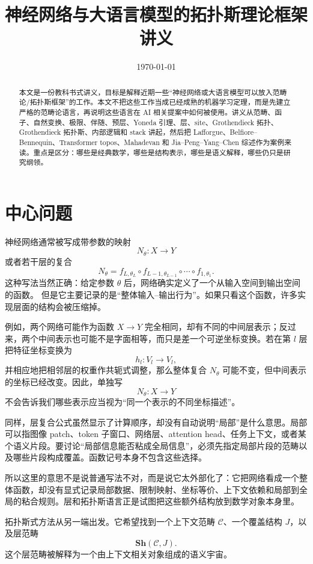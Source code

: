 \documentclass[UTF8,11pt,fontset=none]{ctexart}
\title{神经网络与大语言模型的拓扑斯理论框架讲义}
\author{}
\date{\today}
\newcommand{\Sh}{\mathbf{Sh}}
\begin{document}
\maketitle

\begin{abstract}
本文是一份教科书式讲义，目标是解释近期一些“神经网络或大语言模型可以放入范畴论/拓扑斯框架”的工作。本文不把这些工作当成已经成熟的机器学习定理，而是先建立严格的范畴论语言，再说明这些语言在 AI 相关提案中如何被使用。讲义从范畴、函子、自然变换、极限、伴随、预层、Yoneda 引理、层、site、Grothendieck 拓扑、Grothendieck 拓扑斯、内部逻辑和 stack 讲起，然后把 Lafforgue、Belfiore--Bennequin、Transformer topos、Mahadevan 和 Jia--Peng--Yang--Chen 综述作为案例来读。重点是区分：哪些是经典数学，哪些是结构表示，哪些是语义解释，哪些仍只是研究纲领。
\end{abstract}

\section{中心问题}

神经网络通常被写成带参数的映射
\[
N_\theta:X\longrightarrow Y
\]
或者若干层的复合
\[
N_\theta=f_{L,\theta_L}\circ f_{L-1,\theta_{L-1}}\circ\cdots\circ f_{1,\theta_1}.
\]
这种写法当然正确：给定参数 \(\theta\) 后，网络确实定义了一个从输入空间到输出空间的函数。
但是它主要记录的是“整体输入--输出行为”。如果只看这个函数，许多实现层面的结构会被压缩掉。

例如，两个网络可能作为函数 \(X\to Y\) 完全相同，却有不同的中间层表示；反过来，两个中间表示也可能不是字面相等，而只是差一个可逆坐标变换。若在第 \(l\) 层把特征坐标变换为
\[
h_l:V_l\longrightarrow V_l,
\]
并相应地把相邻层的权重作共轭式调整，那么整体复合 \(N_\theta\) 可能不变，但中间表示的坐标已经改变。因此，单独写
\[
N_\theta:X\to Y
\]
不会告诉我们哪些表示应当视为“同一个表示的不同坐标描述”。

同样，层复合公式虽然显示了计算顺序，却没有自动说明“局部”是什么意思。局部可以指图像 patch、token 子窗口、网络层、attention head、任务上下文，或者某个语义片段。要讨论“局部信息能否粘成全局信息”，必须先指定局部片段的范畴以及哪些片段构成覆盖。函数记号本身不包含这些选择。

所以这里的意思不是说普通写法不对，而是说它太外部化了：它把网络看成一个整体函数，却没有显式记录局部数据、限制映射、坐标等价、上下文依赖和局部到全局的粘合规则。层和拓扑斯语言正是试图把这些额外结构放到数学对象本身里。

拓扑斯式方法从另一端出发。它希望找到一个上下文范畴 \(\mathcal C\)、一个覆盖结构 \(J\)，以及层范畴
\[
\Sh(\mathcal C,J).
\]
这个层范畴被解释为一个由上下文相关对象组成的语义宇宙。
\end{document}
